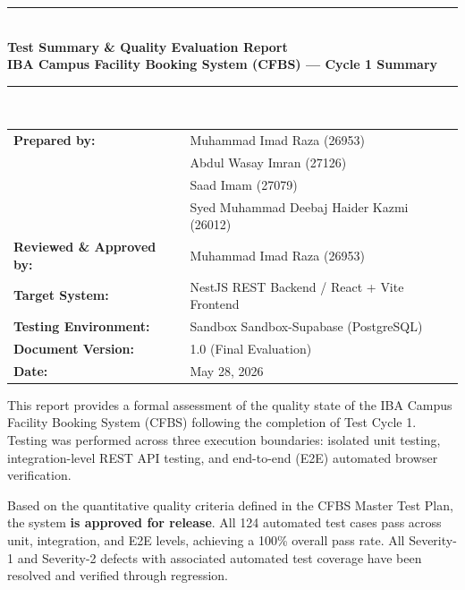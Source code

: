 \documentclass[11pt,a4paper]{article}
\begin{document}
\begin{center}
    \vspace*{1cm}
    \rule{\textwidth}{1.5pt} \\[0.3cm]
    {\huge \textbf{Test Summary \& Quality Evaluation Report}} \\[0.2cm]
    {\large \textbf{IBA Campus Facility Booking System (CFBS) --- Cycle 1 Summary}} \\
    \rule{\textwidth}{1.5pt} \\[1.5cm]
    
    \begin{tabular}{ll}
        \textbf{Prepared by:} & Muhammad Imad Raza (26953)\\
                             & Abdul Wasay Imran (27126) \\
                             & Saad Imam (27079) \\
                             & Syed Muhammad Deebaj Haider Kazmi (26012) \\[0.3cm]
        \textbf{Reviewed \& Approved by:} & Muhammad Imad Raza (26953) \\
        \textbf{Target System:} & NestJS REST Backend / React + Vite Frontend \\
        \textbf{Testing Environment:} & Sandbox Sandbox-Supabase (PostgreSQL) \\
        \textbf{Document Version:} & 1.0 (Final Evaluation) \\
        \textbf{Date:} & May 28, 2026 \\
    \end{tabular}
\end{center}

\vspace{1.5cm}

\begin{tcolorbox}[colback=lightgray,colframe=primaryblue,title=\textbf{Executive Summary \& Release Recommendation}]
This report provides a formal assessment of the quality state of the IBA Campus Facility Booking System (CFBS) following the completion of Test Cycle 1. Testing was performed across three execution boundaries: isolated unit testing, integration-level REST API testing, and end-to-end (E2E) automated browser verification.

Based on the quantitative quality criteria defined in the CFBS Master Test Plan, the system \textbf{is approved for release}. All 124 automated test cases pass across unit, integration, and E2E levels, achieving a 100\% overall pass rate. All Severity-1 and Severity-2 defects with associated automated test coverage have been resolved and verified through regression.
\end{tcolorbox}
\end{document}
